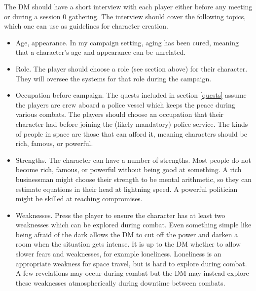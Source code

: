 \documentclass[a4paper]{article}
\begin{document}
The DM should have a short interview with each player either before any meeting or during a session 0 gathering. The interview should cover the following topics, which one can use as guidelines for character creation.
\begin{itemize}
\item Age, appearance. In my campaign setting, aging has been cured, meaning that a character's age and appearance can be unrelated. 
\item Role. The player should choose a role (see section above) for their character. They will oversee the systems for that role during the campaign. 
\item Occupation before campaign. The quests included in section \ref{quests} assume the players are crew aboard a police vessel which keeps the peace during various combats. The players should choose an occupation that their character had before joining the (likely mandatory) police service. The kinds of people in space are those that can afford it, meaning characters should be rich, famous, or powerful. 
\item Strengths. The character can have a number of strengths. Most people do not become rich, famous, or powerful without being good at something. A rich businessman might choose their strength to be mental arithmetic, so they can estimate equations in their head at lightning speed. A powerful politician might be skilled at reaching compromises. 
\item Weaknesses. Press the player to ensure the character has at least two weaknesses which can be explored during combat. Even something simple like being afraid of the dark allows the DM to cut off the power and darken a room when the situation gets intense. It is up to the DM whether to allow slower fears and weaknesses, for example loneliness. Loneliness is an appropriate weakness for space travel, but is hard to explore during combat. A few revelations may occur during combat but the DM may instead explore these weaknesses atmospherically during downtime between combats. 
\end{itemize}
\end{document}
